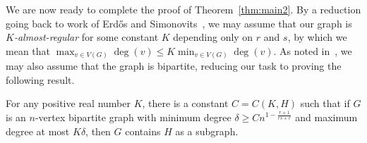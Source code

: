 We are now ready to complete the proof of Theorem~\ref{thm:main2}. By a reduction going back to work of Erd\H{o}s and Simonovits~\cite{ES70}, we may assume that our graph is {\it $K$-almost-regular} for some constant $K$ depending only on $r$ and $s$, by which we mean that $\max_{v \in V(G)} \deg(v) \leq K \min_{v \in V(G)} \deg(v)$. As noted in~\cite{CL21}, we may also assume that the graph is bipartite, reducing our task to proving the following result.

\begin{theorem} \label{thm:regular}
	For any positive real number $K$, there is a constant $C=C(K,H)$ such that if $G$ is an $n$-vertex bipartite graph with minimum degree $\delta \geq Cn^{1-\frac{r+1}{rs+r}}$ and maximum degree at most $K\delta$, then $G$ contains $H$ as a subgraph.
\end{theorem}

